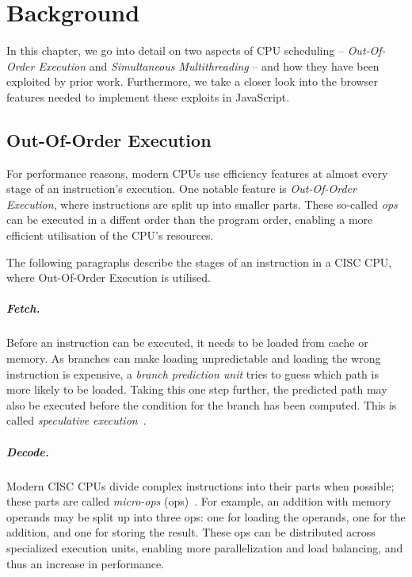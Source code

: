 \documentclass[11pt,
  titlepage=false,
  parskip=half,      %
]{scrreprt}
\begin{document}
\chapter{Background}
\label{ch:background}

In this chapter, we go into detail on two aspects of CPU scheduling
-- \textit{Out-Of-Order Execution} and \textit{Simultaneous Multithreading} --
and how they have been exploited by prior work.
Furthermore, we take a closer look into the browser features needed to implement these exploits in JavaScript.

\section{Out-Of-Order Execution}
\label{sec:outoforderexecution}
For performance reasons, modern CPUs use efficiency features at almost every stage of an instruction's execution.
One notable feature is \textit{Out-Of-Order Execution},
where instructions are split up into smaller parts.
These so-called \textit{\textmu ops} can be executed in a diffent order than the program order,
enabling a more efficient utilisation of the CPU's resources.

The following paragraphs describe the stages of an instruction in a CISC CPU,
where Out-Of-Order Execution is utilised.

\paragraph{Fetch.}
Before an instruction can be executed, it needs to be loaded from cache or memory.
As branches can make loading unpredictable and loading the wrong instruction is expensive, a \textit{branch prediction unit} tries to guess which path is more likely to be loaded.
Taking this one step further, the predicted path may also be executed before the condition for the branch has been computed.
This is called \textit{speculative execution}~\cite{AMD2020OptimizationEPYC7002}.

\paragraph{Decode.}
Modern CISC CPUs divide complex instructions into their parts when possible;
these parts are called \textit{micro-ops} (\textmu ops)~\cite{AMD2020OptimizationEPYC7002}.
For example, an addition with memory operands may be split up into three \textmu ops: one for loading the operands, one for the addition, and one for storing the result.
These \textmu ops can be distributed across specialized execution units, enabling more parallelization and load balancing, and thus an increase in performance.
\end{document}

